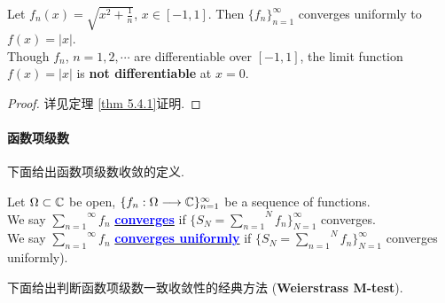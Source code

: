 \begin{thm}
\begin{rmk}
\begin{itemize}
				\vspace{1em}
				
				\begin{example}\label{ex 6.2.1}
					Let $f_{n}(x) = \sqrt{x^2 + \frac{1}{n}}$, $x \in [-1 , 1]$. Then $\{ f_n \}_{n = 1}^{\infty}$ converges uniformly to $f(x) = \left| x \right|$. \\
					Though $f_n$, $n = 1 , 2 , \cdots$ are differentiable over $[-1 , 1]$, the limit function $f(x) = \left| x \right|$ is \textbf{not differentiable} at $x = 0$.
				\end{example}
			\end{itemize}
		\end{rmk}
	
		\vspace{2em}
		\begin{proof}
			详见定理 \ref{thm 5.4.1}证明.
		\end{proof}
	\end{thm}

\newpage

\paragraph{函数项级数}
	下面给出函数项级数收敛的定义.
	\begin{defn}\label{def 6.2.1}
		Let $\Omega \subset \mathbb{C}$ be open, $\{ f_n : \Omega \longrightarrow \mathbb{C} \}_{n = 1}^{\infty}$ be a sequence of functions. \\
		We say $\overset{\infty}{\underset{n = 1}{\sum}}{f_n}$ \underline{\textcolor{blue}{\textbf{converges}}} if $\{ S_{N} = \overset{N}{\underset{n = 1}{\sum}}{f_n} \}_{N = 1}^{\infty}$ converges.  \\
		We say $\overset{\infty}{\underset{n = 1}{\sum}}{f_n}$ \underline{\textcolor{blue}{\textbf{converges uniformly}}} if $\{ S_{N} = \overset{N}{\underset{n = 1}{\sum}}{f_n} \}_{N = 1}^{\infty}$ converges uniformly).
	\end{defn}

	\vspace{2em}
	下面给出判断函数项级数一致收敛性的经典方法 (\textbf{Weierstrass M-test}).
	

